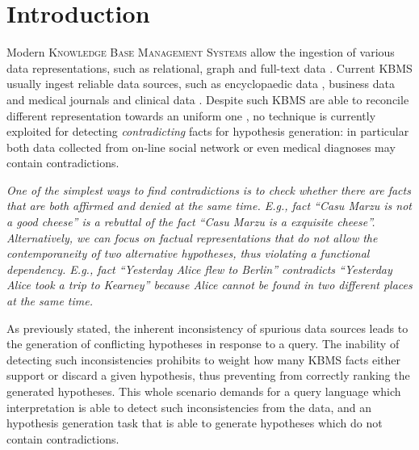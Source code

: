 
\section{Introduction}

Modern \textsc{Knowledge Base Management Systems} allow the ingestion of various data representations, such as relational, graph and full-text data \cite{ibmwatson}. Current KBMS usually ingest reliable data sources, such as encyclopaedic data \cite{ibmwatson}, business data \cite{Saha16} and medical journals and clinical data \cite{WANG201834}. 
Despite such KBMS are able to reconcile different representation towards an uniform one \cite{Niu}, no technique is currently exploited for detecting \textit{contradicting} facts for hypothesis generation: in particular both data collected from on-line social network \cite{Lazer1094} or even medical diagnoses \cite{imihl} may contain contradictions.


\begin{example}
\textit{One of the simplest ways to find contradictions is to check whether there are facts that are both affirmed and denied at the same time. E.g., fact ``Casu Marzu is not a good cheese'' is a rebuttal of the fact ``Casu Marzu is a exquisite cheese''. Alternatively, we can focus on factual representations that do not allow the contemporaneity of two alternative hypotheses, thus violating a functional dependency. E.g., fact ``Yesterday Alice flew to Berlin'' contradicts ``Yesterday Alice took a trip to Kearney'' because Alice cannot be found in two different places at the same time.}
\end{example}

As previously stated, the inherent inconsistency of spurious data sources leads to the generation of conflicting hypotheses in response to a query. The inability of detecting such inconsistencies prohibits to weight how many KBMS facts either support or discard a given hypothesis, thus preventing from correctly ranking the generated hypotheses. This whole scenario demands for a query language which interpretation is able to detect such inconsistencies from the data, and an hypothesis generation task that is able to generate hypotheses which do not contain contradictions. 

